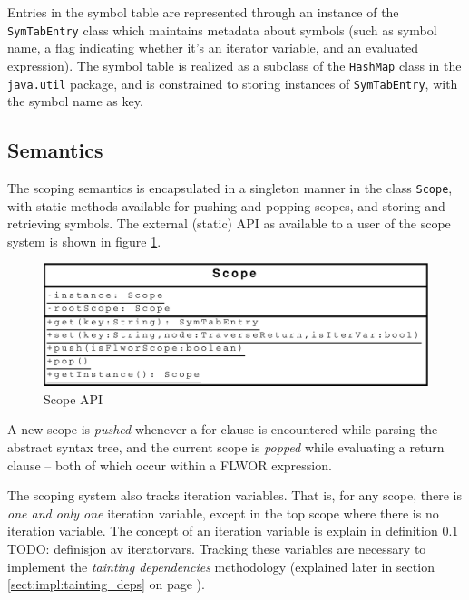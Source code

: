 Entries in the symbol table are represented through an instance of the
\texttt{SymTabEntry} class which maintains metadata about symbols (such as
symbol name, a flag indicating whether it's an iterator variable, and an
evaluated expression). The symbol table is realized as a subclass of the
\texttt{HashMap} class in the \texttt{java.util} package, and is constrained to
storing instances of \texttt{SymTabEntry}, with the symbol name as key.

\subsection{Semantics}
The scoping semantics is encapsulated in a singleton manner in the class
\texttt{Scope}, with static methods available for pushing and popping scopes,
and storing and retrieving symbols. The external (static) API as available to a
user of the scope system is shown in figure \ref{fig:impl:scope_uml}.

\begin{figure}[!htp]
\begin{center}
  \includegraphics[scale=0.5]{diagrams/scope_uml}
  \caption{Scope API}
  \label{fig:impl:scope_uml}
\end{center}
\end{figure}

A new scope is \textit{pushed} whenever a for-clause is encountered while
parsing the abstract syntax tree, and the current scope is \textit{popped} while
evaluating a return clause -- both of which occur within a FLWOR expression.

The scoping system also tracks iteration variables. That is, for any scope,
there is \textit{one and only one} iteration variable, except in the top scope
where there is no iteration variable. The concept of an iteration variable is
explain in definition \ref{} TODO: definisjon av iteratorvars. Tracking these
variables are necessary to implement the \textit{tainting dependencies}
methodology (explained later in section \ref{sect:impl:tainting_deps} on page
\pageref{sect:impl:tainting_deps}).